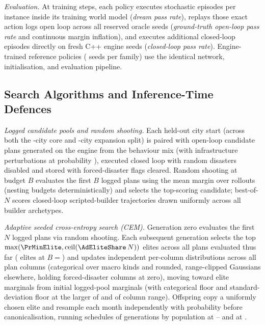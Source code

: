 \emph{Evaluation.} At \PrSnapshots{} training steps, each policy executes \RlEpisodes{} stochastic episodes per instance inside its training world model (\emph{dream pass rate}), replays those exact action logs open loop across all \OracleSeeds{} reserved oracle seeds (\emph{ground-truth open-loop pass rate} and continuous margin inflation), and executes \RlEpisodes{} additional closed-loop episodes directly on fresh C++ engine seeds (\emph{closed-loop pass rate}). Engine-trained reference policies (\RlEngSeeds{} seeds per family) use the identical network, initialisation, and evaluation pipeline.

\begin{table}[tbp]
\caption{Shared PPO architecture and optimisation hyperparameters verified across all \RlRunsDone{} world-model runs and engine-trained reference runs.}
\label{tab:ppo}
\centering\scriptsize\setlength{\tabcolsep}{4pt}

\end{table}

\subsection{Search Algorithms and Inference-Time Defences}\label{app:searches}

\emph{Logged candidate pools and random shooting.} Each held-out city start (across both the \HeldOutFamilies-city core and \XCities-city expansion split) is paired with \PrLoggedPerStart{} open-loop candidate plans generated on the engine from the behaviour mix (with infrastructure perturbations at probability \PrPerturb{}), executed closed loop with random disasters disabled and stored with forced-disaster flags cleared. Random shooting at budget $B$ evaluates the first $B$ logged plans using the mean margin over \KSearch{} rollouts (nesting budgets deterministically) and selects the top-scoring candidate; best-of-$N$ scores closed-loop scripted-builder trajectories drawn uniformly across all \BuilderStyles{} builder archetypes.

\emph{Adaptive seeded cross-entropy search (CEM).} Generation zero evaluates the first $N$ logged plans via random shooting. Each subsequent generation selects the top $\max(\PrMinElite, \mathrm{ceil}(\AdEliteShare\,N))$ elites across all plans evaluated thus far (\PrEliteThou{} elites at $B ={}$) and updates independent per-column distributions across all \PlanColumns{} plan columns (categorical over macro kinds and rounded, range-clipped Gaussians elsewhere, holding forced-disaster columns at zero), moving \PrSmooth{} toward elite marginals from initial logged-pool marginals (with categorical floor \PrProbFloor{} and standard-deviation floor at the larger of \PrSdFloor{} and \PrSdFloorFrac{} of column range). Offspring copy a uniformly chosen elite and resample each month independently with probability \AdReplace{} before canonicalisation, running schedules of \AdSchedule{} generations by population at -- and \AdScheduleTop{} at .

